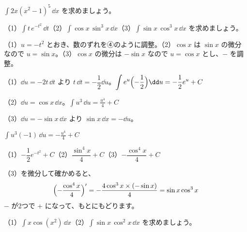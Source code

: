 \begin{jibun}
$\displaystyle\int2x(x^2-1)^5\,\dd x$ を求めましょう。
\end{jibun}

\begin{reidai}[係数を調整する置換積分]
（1）$\displaystyle\int t\,e^{-t^2}\,\dd t$\quad（2）$\displaystyle\int\cos x\,\sin^3x\,\dd x$\quad（3）$\displaystyle\int\sin x\,\cos^3x\,\dd x$ を求めましょう。\par
\kangaekata（1）$u=-t^2$ とおき、数のずれを④のように調整。（2）$\cos x$ は $\sin x$ の微分なので $u=\sin x$。（3）$\cos x$ の微分は $-\sin x$ なので $u=\cos x$ とし、$-$ を調整。\par
\shiki（1）$\dd u=-2t\,\dd t$ より $t\,\dd t=-\dfrac{1}{2}\dd u$。$\displaystyle\int e^u\Bigl(-\frac{1}{2}\Bigr)\dd u=-\frac{1}{2}e^u+C$\par
\hspace*{2.6\zw}（2）$\dd u=\cos x\,\dd x$。$\displaystyle\int u^3\,\dd u=\frac{u^4}{4}+C$\par
\hspace*{2.6\zw}（3）$\dd u=-\sin x\,\dd x$ より $\sin x\,\dd x=-\dd u$。\par
\hspace*{2.6\zw}\phantom{（3）}$\displaystyle\int u^3(-1)\,\dd u=-\frac{u^4}{4}+C$\par
\kotae （1）$-\dfrac{1}{2}e^{-t^2}+C$\quad（2）$\dfrac{\sin^4x}{4}+C$\quad（3）$-\dfrac{\cos^4x}{4}+C$
\end{reidai}
（3）を微分して確かめると、
\[ \Bigl(-\frac{\cos^4x}{4}\Bigr)'=-\frac{4\cos^3x\times(-\sin x)}{4}=\sin x\cos^3x \]
$-$ が2つで $+$ になって、もとにもどります。

\begin{jibun}
（1）$\displaystyle\int x\cos(x^2)\,\dd x$\quad（2）$\displaystyle\int\sin x\,\cos^2x\,\dd x$ を求めましょう。
\end{jibun}


